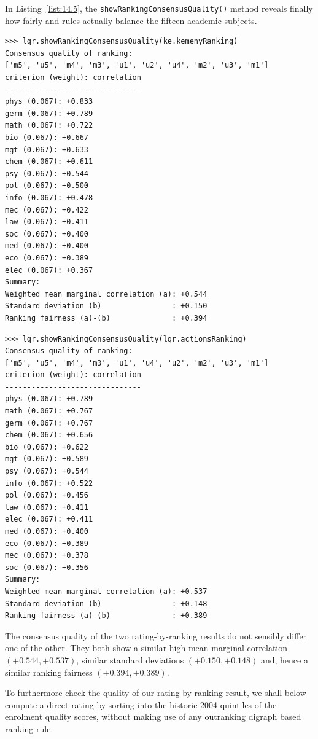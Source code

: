 In Listing~\vref{list:14.5}, the \texttt{showRankingConsensusQuality()} method reveals finally how fairly \Kemeny and \Copeland rules actually balance the fifteen academic subjects. 
\begin{lstlisting}[caption={Checking the consensus quality of the \Kemeny ranking},label=list:14.5,basicstyle=\ttfamily\scriptsize]
>>> lqr.showRankingConsensusQuality(ke.kemenyRanking)
Consensus quality of ranking:
['m5', 'u5', 'm4', 'm3', 'u1', 'u2', 'u4', 'm2', 'u3', 'm1']
criterion (weight): correlation
-------------------------------
phys (0.067): +0.833
germ (0.067): +0.789
math (0.067): +0.722
bio (0.067): +0.667
mgt (0.067): +0.633
chem (0.067): +0.611
psy (0.067): +0.544
pol (0.067): +0.500
info (0.067): +0.478
mec (0.067): +0.422
law (0.067): +0.411
soc (0.067): +0.400
med (0.067): +0.400
eco (0.067): +0.389
elec (0.067): +0.367
Summary:
Weighted mean marginal correlation (a): +0.544
Standard deviation (b)                : +0.150
Ranking fairness (a)-(b)              : +0.394
\end{lstlisting}

\begin{lstlisting}[caption={Checking the consensus quality of the \Copeland ranking},label=list:14.6,basicstyle=\ttfamily\scriptsize]
>>> lqr.showRankingConsensusQuality(lqr.actionsRanking)
Consensus quality of ranking:
['m5', 'u5', 'm4', 'm3', 'u1', 'u4', 'u2', 'm2', 'u3', 'm1']
criterion (weight): correlation
-------------------------------
phys (0.067): +0.789
math (0.067): +0.767
germ (0.067): +0.767
chem (0.067): +0.656
bio (0.067): +0.622
mgt (0.067): +0.589
psy (0.067): +0.544
info (0.067): +0.522
pol (0.067): +0.456
law (0.067): +0.411
elec (0.067): +0.411
med (0.067): +0.400
eco (0.067): +0.389
mec (0.067): +0.378
soc (0.067): +0.356
Summary:
Weighted mean marginal correlation (a): +0.537
Standard deviation (b)                : +0.148
Ranking fairness (a)-(b)              : +0.389
\end{lstlisting}

The consensus quality of the two rating-by-ranking results do not sensibly differ one of the other. They both show a similar high mean marginal correlation $(+0.544, +0.537)$, similar standard deviations $(+0.150, +0.148)$ and, hence a similar ranking fairness $(+0.394, +0.389)$. 

To furthermore check the quality of our \Copeland rating-by-ranking result, we shall below compute a direct rating-by-sorting into the historic 2004 quintiles of the enrolment quality scores, without making use of any outranking digraph based ranking rule.

